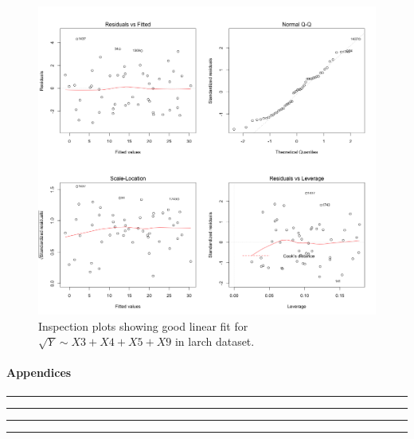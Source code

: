 \documentclass{article}
\begin{document}
\begin{figure}[h!]
  \includegraphics[width=\linewidth]{project/images/07-larch.png}
  \caption{Inspection plots showing good linear fit for $\sqrt{Y} \sim X3+X4+X5+X9$ in larch dataset.}
  \label{fig:07-larch}
\end{figure}

\newpage

\paragraph{Appendices}



\rule{\textwidth}{1pt}



\rule{\textwidth}{1pt}

\newpage



\rule{\textwidth}{1pt}



\rule{\textwidth}{1pt}
\end{document}
